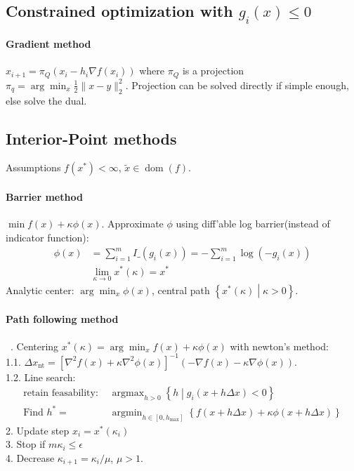\documentclass[landscape,a4paper,8pt]{scrartcl}
\DeclareMathOperator\argmin{argmin}
\DeclareMathOperator\argmax{argmax}
\DeclareMathOperator\dom{dom}
\begin{document}
\begin{multicols*}{3}
\subsection{Constrained optimization with $g_i(x) \leq 0$}
\paragraph{Gradient method}
$x_{i+1} = \pi_Q(x_i - h_i\nabla f(x_i))$ where $\pi_Q$ is a projection $\pi_q = \arg\min_x\frac{1}{2}\lVert x - y \rVert_2^2$. Projection can be solved directly if simple enough, else solve the dual.

\subsection{Interior-Point methods}
Assumptions $f(x^*) < \infty$, $\tilde x \in \dom(f)$.

\paragraph{Barrier method}
$\min f(x) + \kappa \phi(x)$.
Approximate $\phi$ using diff'able log barrier(instead of indicator function):
\begin{align*}
\phi(x) &= \sum_{i=1}^{m} I\_(g_i(x)) = -\sum_{i=1}^{m} \log(-g_i(x)) \\
        & \lim_{\kappa \rightarrow 0} x^*(\kappa) = x^*
\end{align*}
Analytic center: $\arg\min_x \phi(x)$, central path $\left\{x^*(\kappa) \middle| \kappa > 0 \right\}$.

\paragraph{Path following method} \ . Centering 
$x^*(\kappa) = \arg\min_x f(x) + \kappa\phi(x)$ with newton's method: \\
1.1. $\Delta x_\text{nt} = \left[\nabla^2 f(x) + \kappa \nabla^2\phi(x)\right]^{-1}(-\nabla f(x) - \kappa \nabla \phi(x))$. \\
1.2. Line search:
\begin{align*}
\text{retain feasability: } & \argmax_{h > 0} \left\{ h \middle| g_i(x+h\Delta x) < 0 \right\} \\
\text{Find } h^* = & \argmin_{h\in[0,h_\text{max}]} \left\{ f(x+h\Delta x) + \kappa\phi(x+h\Delta x) \right\}
\end{align*}
2. Update step $x_i = x^*(\kappa_i)$ \\
3. Stop if $m\kappa_i \leq \epsilon$ \\
4. Decrease $\kappa_{i+1} = \kappa_{i}/\mu$, $\mu > 1$.


\end{multicols*}
\end{document}
